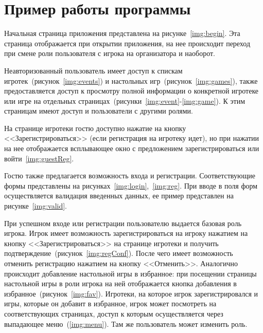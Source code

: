 \section{Пример работы программы}

Начальная страница приложения представлена на рисунке~\ref{img:begin}. Эта
страница отображается при открытии приложения, на нее происходит переход при
смене роли пользователя с игрока на организатора и наоборот.

Неавторизованный пользователь имеет доступ к спискам
игротек~(рисунок~\ref{img:events}) и настольных игр~(рисунок~\ref{img:games}),
также предоставляется доступ к просмотру полной информации о конкретной игротеке
или игре на отдельных страницах~(рисунки~\ref{img:event}-\ref{img:game}). К этим
страницам имеют доступ и пользователи с другими ролями.

\clearpage
{}
\clearpage

На странице игротеки гостю доступно нажатие на кнопку
<<Зарегистрироваться>> (если регистрация на игротеку идет), но при нажатии на
нее отображается всплывающее окно с предложением зарегистрироваться или
войти~\ref{img:guestReg}.


Гостю также предлагается возможность входа и регистрации. Соответствующие формы
представлены на рисунках~\ref{img:login},~\ref{img:reg}. При вводе в поля форм
осуществляется валидация введенных данных, ее пример представлен на
рисунке~\ref{img:valid}.


При успешном входе или регистрации пользователю выдается базовая роль игрока.
Игрок имеет возможность зарегистрироваться на игроку нажатием на кнопку
<<Зарегистрироваться>> на странице игротеки и получить
подтверждение~(рисунок~\ref{img:regConf}). После чего имеет возможность отменить
регистрацию нажатием на кнопку <<Отменить>>. Аналогично происходит добавление
настольной игры в избранное: при посещении страницы настольной игры в роли
игрока на ней отображается кнопка добавления в
избранное~(рисунок~\ref{img:fav}). Игротеки, на которое игрок зарегистрировался
и игры, которые он добавит в избранное, игрок может посмотреть на соответствующих
страницах, доступ к которым осуществляется через выпадающее
меню~(\ref{img:menu}). Там же пользователь может изменить роль.

